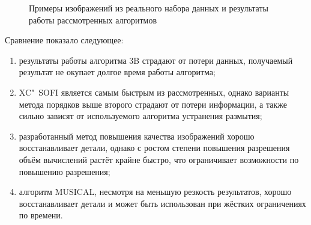 \begin{figure}[ht]
	\caption{Примеры изображений из реального набора данных и результаты работы рассмотренных алгоритмов}
	\label{fig:blinking-results-real}
\end{figure}

Сравнение показало следующее:

\begin{enumerate}[beginpenalty=10000]
	\item результаты работы алгоритма 3B страдают от потери данных, получаемый результат не окупает долгое время работы алгоритма;
	\item XC"~SOFI является самым быстрым из рассмотренных, однако варианты метода порядков выше второго страдают от потери информации, а также сильно зависят от используемого алгоритма устранения размытия;
	\item разработанный метод повышения качества изображений хорошо восстанавливает детали, однако с ростом степени повышения разрешения объём вычислений растёт крайне быстро, что ограничивает возможности по повышению разрешения;
	\item алгоритм MUSICAL, несмотря на меньшую резкость результатов, хорошо восстанавливает детали и может быть использован при жёстких ограничениях по времени.
\end{enumerate}

